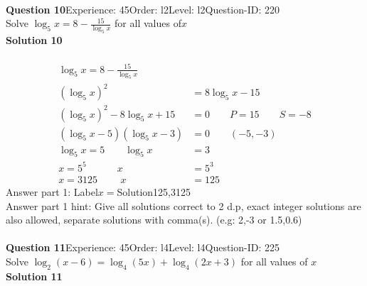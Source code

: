 \documentclass{article}
\begin{document}
\\[4pt]
\noindent\textbf{Question 10}\hspace{20pt}Experience: 45\hspace{20pt}Order: l2\hspace{20pt}Level: l2\hspace{20pt}Question-ID: 220\\[2pt]
Solve $\log_{5}x=8-\displaystyle\frac{15}{\log_5{x}}$ for all values of$x$\\[4pt]
\noindent\textbf{Solution 10}\\[2pt]
\\[-35pt]\begin{align*}
\log_{5}x=8-\displaystyle\frac{15}{\log_5{x}}\\[2pt]
(\log_{5}x)^2&=8\log_{5}x-15\\[2pt]
(\log_{5}x)^2-8\log_{5}x+15&=0\qquad P=15 \qquad S=-8\\[2pt]
(\log_{5}x-5)(\log_{5}x-3)&=0\qquad (-5,-3)\\[2pt]
\log_{5}x=5\qquad\log_{5}x&=3\\[2pt]
x=5^5\hspace{37pt} x&=5^3\\[2pt]
x=3125\hspace{28pt}x&=125
\end{align*}
Answer part 1: \hspace{10pt}Label\hspace{10pt}$x=$\hspace{10pt}Solution\hspace{10pt}125,3125\\
Answer part 1 hint: \hspace{15pt} Give all solutions correct to 2 d.p, exact integer solutions are also allowed, separate solutions with comma(s). (e.g: 2,-3 or 1.5,0.6)\\
\\[4pt]
\noindent\textbf{Question 11}\hspace{20pt}Experience: 45\hspace{20pt}Order: l4\hspace{20pt}Level: l4\hspace{20pt}Question-ID: 225\\[2pt]
Solve $\log_{2}(x-6)=\log_{4}(5x)+\log_{4}(2x+3)$ for all values of $x$\\[4pt]
\noindent\textbf{Solution 11}\\[2pt]
\end{document}
